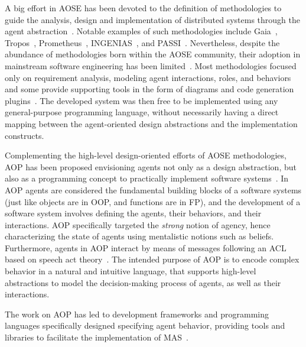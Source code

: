 A big effort in \ac{AOSE} has been devoted to the definition of methodologies to guide the analysis, design and implementation of distributed systems through the agent abstraction~\cite{Wooldridgey_Ciancarini_2001}.
%
Notable examples of such methodologies include Gaia~\cite{Wooldridge_Jennings_Kinny_2000}, Tropos~\cite{Giunchiglia_Mylopoulos_Perini_2002}, Prometheus~\cite{Padgham_Winikoff_2002}, INGENIAS~\cite{Pavón_Gómez-Sanz_2003}, and PASSI~\cite{Cossentino_2005}.
%
Nevertheless,
despite the abundance of methodologies born within the \ac{AOSE} community, their adoption in mainstream software engineering has been limited~\cite{Gómez-Sanz_Fuentes-Fernández_2015}.
%
Most methodologies focused only on requirement analysis, modeling agent interactions, roles, and behaviors and some provide supporting tools in the form of diagrams and code generation plugins~\cite{Bergenti_Gleizes_Zambonelli_2006,Gómez-Sanz_Fuentes-Fernández_2015}. 
%
The developed system was then free to be implemented using any general-purpose programming language, without necessarily having a direct mapping between the agent-oriented design abstractions and the implementation constructs. 

Complementing the high-level design-oriented efforts of \ac{AOSE} methodologies, \ac{AOP} has been proposed envisioning agents not only as a design abstraction, but also as a programming concept to practically implement software systems~\cite{Shoham_1993}.
%
In \ac{AOP} agents are considered the fundamental building blocks of a software systems (just like objects are in \ac{OOP}, and functions are in \ac{FP}), and the development of a software system involves defining the agents, their behaviors, and their interactions.
%
\ac{AOP} specifically targeted the \emph{strong} notion of agency, hence characterizing the state of agents using mentalistic notions such as beliefs. Furthermore, agents in \ac{AOP} interact by means of messages following an \ac{ACL}
based on speech act theory~\cite{Austin_1975}.
%
The intended purpose of \ac{AOP} is to encode complex behavior in a natural and intuitive language, that supports high-level abstractions to model the decision-making process of agents, as well as their interactions. 

The work on \ac{AOP} has led to development frameworks and programming languages specifically designed specifying agent behavior, providing tools and libraries to facilitate the implementation of \ac{MAS}~\cite{Cardoso_Ferrando_2021}.

